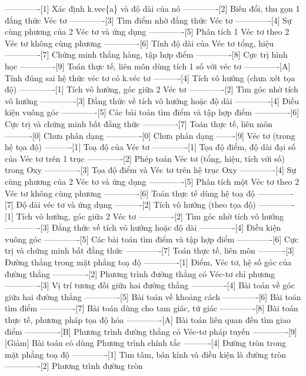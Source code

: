 -------------[1] Xác định k.vec\{a\} và độ dài của nó
-------------[2] Biến đổi, thu gọn 1 đẳng thức Véc tơ
-------------[3] Tìm điểm nhờ đẳng thức Véc tơ
-------------[4] Sự cùng phương của 2 Véc tơ và ứng dụng
-------------[5] Phân tích 1 Véc tơ theo 2 Véc tơ không cùng phương
-------------[6] Tính độ dài của Véc tơ tổng, hiệu
-------------[7] Chứng minh thẳng hàng, tập hợp điểm
-------------[8] Cực trị hình học
-------------[9] Toán thực tế, liên môn dùng tích 1 số với véc tơ
-------------[A] Tính đúng sai hệ thức véc tơ có k.véc tơ
----------[4] Tích vô hướng (chưa xét tọa độ)
-------------[1] Tích vô hướng, góc giữa 2 Véc tơ
-------------[2] Tìm góc nhờ tích vô hướng
-------------[3] Đẳng thức về tích vô hướng hoặc độ dài
-------------[4] Điều kiện vuông góc
-------------[5] Các bài toán tìm điểm và tập hợp điểm
-------------[6] Cực trị và chứng minh bất đẳng thức
-------------[7] Toán thực tế, liên môn
----------[0] Chưa phân dạng
-------------[0] Chưa phân dạng
-------[9] Véc tơ (trong hệ tọa độ)
----------[1] Toạ độ của Véc tơ
-------------[1] Tọa độ điểm, độ dài đại số của Véc tơ trên 1 trục
-------------[2] Phép toán Véc tơ (tổng, hiệu, tích với số) trong Oxy
-------------[3] Tọa độ điểm và Véc tơ trên hệ trục Oxy
-------------[4] Sự cùng phương của 2 Véc tơ và ứng dụng
-------------[5] Phân tích một Véc tơ theo 2 Véc tơ không cùng phương
-------------[6] Toán thực tế dùng hệ toạ độ
-------------[7] Độ dài véc tơ và ứng dụng
----------[2] Tích vô hướng (theo tọa độ)
-------------[1] Tích vô hướng, góc giữa 2 Véc tơ
-------------[2] Tìm góc nhờ tích vô hướng
-------------[3] Đẳng thức về tích vô hướng hoặc độ dài
-------------[4] Điều kiện vuông góc
-------------[5] Các bài toán tìm điểm và tập hợp điểm
-------------[6] Cực trị và chứng minh bất đẳng thức
-------------[7] Toán thực tế, liên môn
----------[3] Đường thẳng trong mặt phẳng toạ độ
-------------[1] Điểm, Véc tơ, hệ số góc của đường thẳng
-------------[2] Phương trình đường thẳng có Véc-tơ chỉ phương
-------------[3] Vị trí tương đối giữa hai đường thẳng
-------------[4] Bài toán về góc giữa hai đường thẳng
-------------[5] Bài toán về khoảng cách
-------------[6] Bài toán tìm điểm
-------------[7] Bài toán dùng cho tam giác, tứ giác
-------------[8] Bài toán thực tế, phương pháp tọa độ hóa
-------------[A] Bài toán liên quan đến tìm giao điểm
-------------[B] Phương trình đường thẳng có Véc-tơ pháp tuyến
-------------[9] [Giảm] Bài toán có dùng Phương trình chính tắc
----------[4] Đường tròn trong mặt phẳng toạ độ
-------------[1] Tìm tâm, bán kính và điều kiện là đường tròn
-------------[2] Phương trình đường tròn
